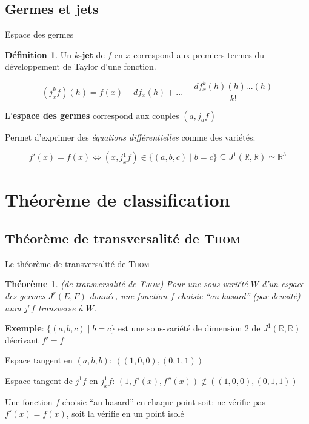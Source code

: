 \documentclass[compress]{beamer}
\newcommand{\R}{\mathbb{R}}
\newtheorem{thm}{Théorème}
\theoremstyle{definition}
\newtheorem{defn}{Définition}
\begin{document}
\subsection{Germes et jets}
\begin{frame}{Espace des germes}
    \begin{defn}
        Un \textbf{$k$-jet} de $f$ en $x$ correspond aux premiers termes du développement de Taylor d'une fonction.

        $$(j^k_x f)(h) = f(x) + df_x(h)+...+\frac{df^k_x(h)(h)...(h)}{k!}$$

        L'\textbf{espace des germes} correspond aux couples $(a, j_af)$
    \end{defn}

    \pause
    Permet d'exprimer des \textit{équations différentielles} comme des variétés:

    $$f'(x)=f(x) \iff (x,j^1_xf) \in \{(a,b,c) \mid b=c \} \subseteq J^1(\R,\R) \simeq \R^3$$
\end{frame}

\section{Théorème de classification}

\subsection{Théorème de transversalité de \textsc{Thom}}
\begin{frame}{Le théorème de transversalité de \textsc{Thom}}
    \begin{thm}{(de transversalité de \textsc{Thom})}
        Pour une sous-variété $W$ d'un espace des germes $J^r(E,F)$ donnée, une fonction $f$ choisie ``au hasard'' (par densité) aura $j^rf$ transverse à $W$.
    \end{thm}

    \pause
    \textbf{Exemple}: $\{(a,b,c) \mid b=c \}$ est une sous-variété de dimension $2$ de $J^1(\R,\R)$ décrivant $f'=f$

    \pause
    Espace tangent en $(a,b,b)$: $\left((1,0,0), (0,1,1)\right)$

    Espace tangent de $j^1f$ en $j^1_xf$: $(1,f'(x),f''(x))\notin\left((1,0,0), (0,1,1)\right)$

    \pause
    Une fonction $f$ choisie ``au hasard'' en chaque point soit: ne vérifie pas $f'(x)=f(x)$, soit la vérifie en un point isolé
\end{frame}
\end{document}
